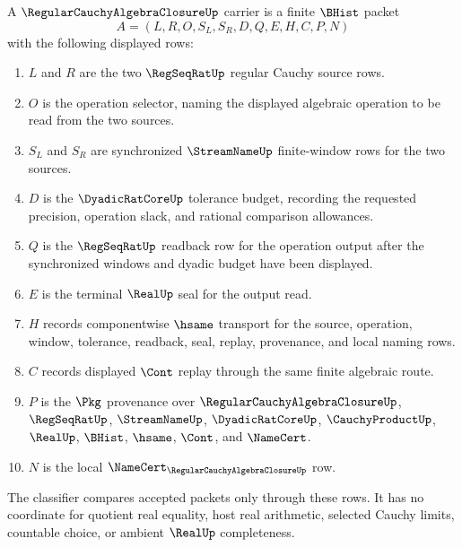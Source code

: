 \begin{definition}
\label{def:regular-cauchy-algebra-closure-carrier}
A $\RegularCauchyAlgebraClosureUp$ carrier is a finite $\BHist$ packet
$$
A=(L,R,O,S_L,S_R,D,Q,E,H,C,P,N)
$$
with the following displayed rows:
\begin{enumerate}
\item $L$ and $R$ are the two $\RegSeqRatUp$ regular Cauchy source rows.
\item $O$ is the operation selector, naming the displayed algebraic operation to be read from the two sources.
\item $S_L$ and $S_R$ are synchronized $\StreamNameUp$ finite-window rows for the two sources.
\item $D$ is the $\DyadicRatCoreUp$ tolerance budget, recording the requested precision, operation slack, and rational comparison allowances.
\item $Q$ is the $\RegSeqRatUp$ readback row for the operation output after the synchronized windows and dyadic budget have been displayed.
\item $E$ is the terminal $\RealUp$ seal for the output read.
\item $H$ records componentwise $\hsame$ transport for the source, operation, window, tolerance, readback, seal, replay, provenance, and local naming rows.
\item $C$ records displayed $\Cont$ replay through the same finite algebraic route.
\item $P$ is the $\Pkg$ provenance over $\RegularCauchyAlgebraClosureUp$, $\RegSeqRatUp$, $\StreamNameUp$, $\DyadicRatCoreUp$, $\CauchyProductUp$, $\RealUp$, $\BHist$, $\hsame$, $\Cont$, and $\NameCert$.
\item $N$ is the local $\NameCert_{\RegularCauchyAlgebraClosureUp}$ row.
\end{enumerate}
The classifier compares accepted packets only through these rows. It has no coordinate for quotient real equality, host real arithmetic, selected Cauchy limits, countable choice, or ambient $\RealUp$ completeness.
\end{definition}

